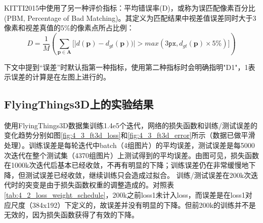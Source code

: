 KITTI2015中使用了另一种评价指标：平均错误率(D)，或称为误匹配像素百分比(PBM, Percentage of Bad Matching)。其定义为匹配结果中视差值误差同时大于3像素和视差真值的5\%的像素点所占比例：
\begin{equation}\label{eq:4_3_D1_error}
D = \frac{1}{M}\left( \sum_{\mathbf{p} \in \mathbf{A}} \Big[ \big| d(\mathbf{p}) - d_{gt}(\mathbf{p})) \big| > max(3\mathtt{px}, d_{gt}(\mathbf{p}) \times 5\%) \Big] \right)
\end{equation}

下文中提到“误差”时默认指第一种指标，使用第二种指标时会明确指明"D1"，1表示误差的计算是在左图上进行的。

\subsection{FlyingThings3D上的实验结果}
使用FlyingThings3D数据集训练1.4e5个迭代，网络的损失函数和训练/测试误差的变化趋势分别如图\ref{fig:4_3_ft3d_loss}和\ref{fig:4_3_ft3d_error}所示（数据已做平滑处理）。训练误差是每轮迭代中batch（4组图片）的平均误差，测试误差是每5000次迭代在整个测试集（4370组图片）上测试得到的平均误差。由图可见，损失函数在1000k次迭代后基本已经收敛，不再有明显的下降；训练误差仍在非常缓慢地下降，但测试误差已经收敛，继续训练只会造成过拟合。
训练/测试误差在200k次迭代时的突变是由于损失函数权重的调整造成的。对照表\ref{tab:4_2_loss_weight_schedule}，200k之前loss1未计入loss，而误差是在loss1对应尺度（384x192）下定义的，故误差并没有明显的下降。但前200k的训练并不是无效的，因为损失函数获得了有效的下降。


